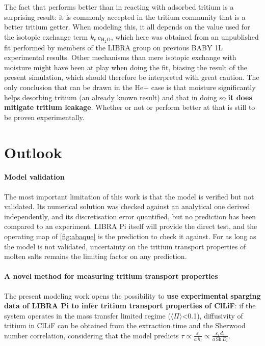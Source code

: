 \documentclass[a4paper,11pt,oneside]{report}
\newcommand{\PI}{\ensuremath{\langle \Pi \rangle}}
\begin{document}
The fact that  performs better than  in reacting with adsorbed tritium is a surprising result: it is commonly accepted in the tritium community that  is a better tritium getter. When modeling this, it all depends on the value used for the isotopic exchange term $k_e\,c_\mathrm{H_2O}$, which here was obtained from an unpublished fit performed by members of the LIBRA group on previous BABY 1L experimental results. Other mechanisms than mere isotopic exchange with moisture might have been at play when doing the fit, biasing the result of the present simulation, which should therefore be interpreted with great caution. The only conclusion that can be drawn in the He+ case is that moisture significantly helps desorbing tritium (an already known result) and that in doing so \textbf{it does mitigate tritium leakage}. Whether or not  or  perform better at that is still to be proven experimentally.   


\section{Outlook}


\paragraph{Model validation}


The most important limitation of this work is that the model is verified but not validated. Its numerical solution was checked against an analytical one derived independently, and its discretisation error quantified, but no prediction has been compared to an experiment. LIBRA Pi itself will provide the direct test, and the operating map of \cref{fig:abaque} is the prediction to check it against. For as long as the model is not validated, uncertainty on the tritium transport properties of molten salts remains the limiting factor on any prediction.

\paragraph{A novel method for measuring tritium transport properties}


The present modeling work opens the possibility to \textbf{use experimental sparging data of LIBRA Pi to infer tritium transport properties of ClLiF}: if the system operates in the mass transfer limited regime (\PI<0.1), diffusivity of tritium in ClLiF can be obtained from the extraction time and the Sherwood number correlation, considering that the model predicts $\tau\propto \frac{\varepsilon_l}{a\,h_l}\propto \frac{\varepsilon_l\,d_b}{a\,\mathrm{Sh}\,D_l}$. 
\end{document}

